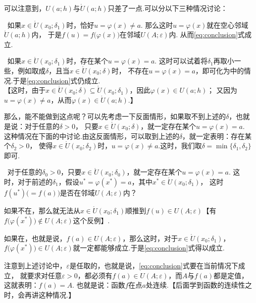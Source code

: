 可以注意到，${U}(a;h)$与$\mathring{U}(a;h)$只差了一点.可以分以下三种情况讨论：\par
{}~如果$x\in\mathring{U}(x_0;\delta_1)$时，恰好$u=\varphi(x)\neq a$.
            那么这时$u=\varphi(x)$就在空心邻域$\mathring{U}(a;h)$内，
            于是$f(u)=f\bigl(\varphi(x)\bigr)$在邻域${U}(A;\varepsilon)$内.
            从而\eqref{eq:conclusion}式成立.\par
{}~如果$x\in\mathring{U}(x_0;\delta_1)$时，存在某个$u=\varphi(x)= a$.
            这时可以试着将$\delta_1$再取小一些，例如取成$\delta$，且当$x\in\mathring{U}(x_0;\delta)$时，
            不存在$u=\varphi(x)= a$，即可化为中的情况.于是\eqref{eq:conclusion}式仍成立.
            \\【这时，由于$x\in\mathring{U}(x_0;\delta)\subseteq \mathring{U}(x_0;\delta_1)$，因此$\varphi(x)\in{U}(a;h)$；
            又因为$u=\varphi(x)\neq a$，从而$\varphi(x)\in\mathring{U}(a;h)$.】\par
            那么，能不能做到这点呢？可以先考虑一下反面情形，如果取不到上述的$\delta$，也就是说：对于任意的$\delta>0$，
            只要$x\in\mathring{U}(x_0;\delta)$，就一定存在某个$u=\varphi(x)= a$.
            这种情况在下面的中讨论.由这反面情形，可以取到上述的$\delta$，就一定表明：存在某个$\delta_2>0$，
            使得$x\in\mathring{U}(x_0;\delta_2)$时，$u=\varphi(x)\neq a$.这时，我们取$\delta=\min\{\delta_1,\delta_2\}$即可.\par
{}~对于任意的$\delta_0>0$，只要$x\in\mathring{U}(x_0;\delta_0)$，就一定存在某个$u=\varphi(x)= a$.
            这时，对于前述的$\delta_1$，假设$u^*=\varphi(x^*)=a$，其中$x^*\in\mathring{U}(x_0;\delta_1)$，
            这时$f(u^*)\bigl(=f(a)\bigr)$是否在邻域${U}(A;\varepsilon)$内？\par
            如果不在，那么就无法从$x\in\mathring{U}(x_0;\delta_1)$顺推到$f(u)\in{U}(A;\varepsilon)$【有$f\bigl(\varphi(x^*)\bigr)\notin{U}(A;\varepsilon)$这个反例】.\par
            如果在，也就是说，$f(a)\in{U}(A;\varepsilon)$，那么这时，对于$x\in\mathring{U}(x_0;\delta_1)$，
            $f\bigl(\varphi(x^*)\bigr)\in{U}(A;\varepsilon)$就一定都能够成立.于是\eqref{eq:conclusion}式得以成立.\par
            注意到上述讨论中，$\varepsilon$是任取的，也就是说，\eqref{eq:conclusion}式要在当前情况下成立，
            就要求对任意$\varepsilon>0$，都必须有$f(a)\in{U}(A;\varepsilon)$，而$A$与$f(a)$都是定值，这就表明：$f(a)=A$.
            也就是说：函数$f$在点$a$处连续.【后面学到函数的连续性之时，会再讲这种情况.】

